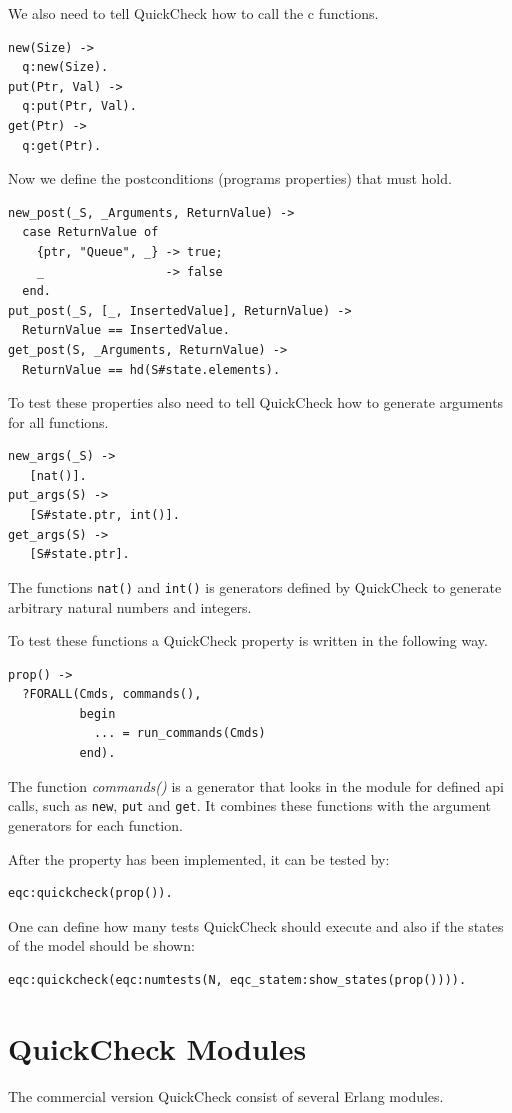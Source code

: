We also need to tell QuickCheck how to call the c functions.
\begin{lstlisting}
new(Size) ->
  q:new(Size).
put(Ptr, Val) ->
  q:put(Ptr, Val).
get(Ptr) ->
  q:get(Ptr).
\end{lstlisting}

Now we define the postconditions (programs properties) that must hold.
\begin{lstlisting}
new_post(_S, _Arguments, ReturnValue) ->
  case ReturnValue of
    {ptr, "Queue", _} -> true;
    _                 -> false
  end.
put_post(_S, [_, InsertedValue], ReturnValue) ->
  ReturnValue == InsertedValue.
get_post(S, _Arguments, ReturnValue) ->
  ReturnValue == hd(S#state.elements).
\end{lstlisting}

To test these properties also need to tell QuickCheck how to generate
arguments for all functions.
\begin{lstlisting}
new_args(_S) ->
   [nat()].
put_args(S) ->
   [S#state.ptr, int()].
get_args(S) ->
   [S#state.ptr].
\end{lstlisting}
The functions \lstinline!nat()! and \lstinline!int()! is generators
defined by QuickCheck to generate arbitrary natural numbers and integers.

To test these functions a QuickCheck property is written in the
following way.
\lstset{style=erlang}
\begin{lstlisting}
prop() ->
  ?FORALL(Cmds, commands(),
          begin
            ... = run_commands(Cmds)
          end).
\end{lstlisting}

The function \emph{commands()} is a generator that looks in the module
for defined api calls, such as \lstinline!new!, \lstinline!put! and
\lstinline!get!. It combines these functions with the argument
generators for each function.

After the property has been implemented, it can be tested by:

\begin{lstlisting}
eqc:quickcheck(prop()).
\end{lstlisting}

One can define how many tests QuickCheck should execute and also if the
states of the model should be shown:
\begin{lstlisting}
eqc:quickcheck(eqc:numtests(N, eqc_statem:show_states(prop()))).
\end{lstlisting}

\section{QuickCheck Modules}
The commercial version QuickCheck consist of several Erlang modules.
